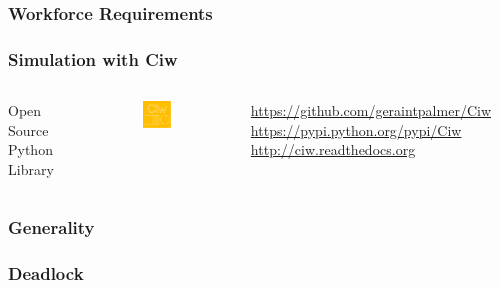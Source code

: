 \documentclass[xcolor={table}]{beamer}
\begin{document}
\begin{frame}
\frametitle{Workforce Requirements}
\end{frame}

\begin{frame}
\frametitle{Simulation with Ciw}
\begin{columns}[c]
Open Source Python Library

\begin{figure}
\includegraphics[width=0.6\textwidth]{logo}
\end{figure}

{\tiny
\url{https://github.com/geraintpalmer/Ciw}\\
\url{https://pypi.python.org/pypi/Ciw}\\
\url{http://ciw.readthedocs.org}\\}

\fontsize{8.5pt}{10pt} \inputminted{python}{ciwexample.py}
\end{columns}
\end{frame}


\begin{frame}
\frametitle{Generality}
\end{frame}

\begin{frame}
    \frametitle{Deadlock}
    \begin{figure}
    
    \end{figure}
\end{frame}
\end{document}
